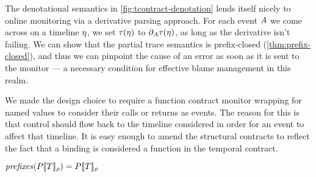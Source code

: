 The denotational semantics in \autoref{fig:tcontract-denotation} lends itself nicely to online monitoring via a derivative parsing approach.
%
For each event $A$ we come across on a timeline $\eta$, we set $\tau(\eta)$ to $\partial_{A}{\tau(\eta)}$, as long as the derivative isn't failing.
%
We can show that the partial trace semantics is prefix-closed (\autoref{thm:prefix-closed}), and thus we can pinpoint the cause of an error as soon as it is sent to the monitor --- a necessary condition for effective blame management in this realm.

We made the design choice to require a function contract monitor wrapping for named values to consider their calls or returns as events.
%
The reason for this is that control should flow back to the timeline considered in order for an event to affect that timeline.
%
It is easy enough to amend the structural contracts to reflect the fact that a binding is considered a function in the temporal contract.

\begin{theorem}\label{thm:prefix-closed}
  $\mathit{prefixes}(P[\![ T ]\!]_{\rho}) = P[\![ T ]\!]_{\rho}$
\end{theorem}

